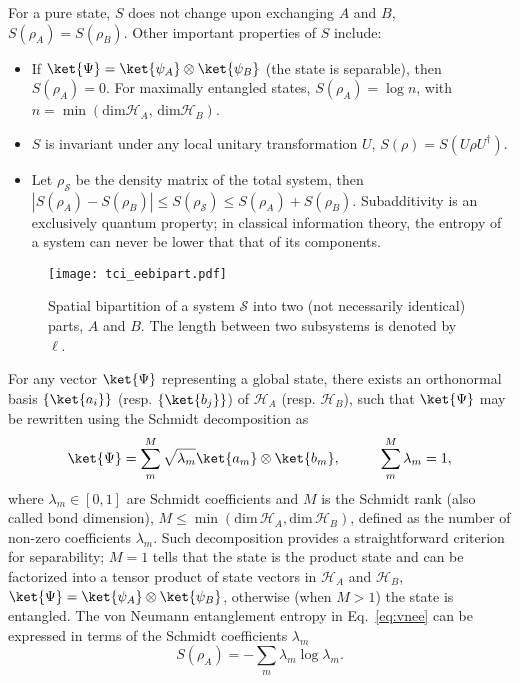 For a pure state, $S$ does not change upon exchanging $A$ and $B$, $S( \rho_A)  = S( \rho_B)$. Other important properties of $S$ include:
\begin{itemize}
\item If $\ket{\Psi} = \ket{\psi_A} \otimes \ket{\psi_B}$ (the state is separable), then $S(\rho_A) = 0$. For maximally entangled states, $S(\rho_A) = \log n$, with $n = \min (\mathrm{dim} \mathcal{H}_A, \, \mathrm{dim} \mathcal{H}_B)$. 
\item $S$ is invariant under any local unitary transformation $U$, $S( \rho) = S (U \rho U^{\dagger})$.
\item Let $\rho_{\mathcal{S}}$ be the density matrix of the total system, then $| S(\rho_A) - S(\rho_B) | \leq S( \rho_{\mathcal{S}}) \leq S(\rho_A) + S(\rho_B)$. Subadditivity is an exclusively quantum property; in classical information theory, the entropy of a system can never be lower that that of its components.
\end{itemize}

\begin{figure}[H]
\centering
\texttt{[image: tci\_eebipart.pdf]}
\caption[Spatial bipartition]{Spatial bipartition of a system $\mathcal{S}$ into two (not necessarily identical) parts, $A$ and $B$. The length between two subsystems is denoted by $\ell$.}
\label{fig:spatial_bipart}
\end{figure}

For any vector $\ket{\Psi}$ representing a global state, there exists an orthonormal basis $\lbrace \ket{a_i} \rbrace$ (resp. $\lbrace \ket{b_j} \rbrace$) of $\mathcal{H}_{A}$ (resp. $\mathcal{H}_{B}$), such that $\ket{\Psi}$ may be rewritten using the Schmidt decomposition as
\begin{equation}
\ket{\Psi} = \sum^M_{m} \sqrt{\lambda_m} \ket{a_m} \otimes \ket{b_m}, \hspace*{1cm} \sum^M_{m} \lambda_m = 1,
\label{eq:schmidt_dec}
\end{equation}
where $\lambda_m \in [0, 1]$ are Schmidt coefficients and $M$ is the Schmidt rank (also called bond dimension), $M \leq \min (\mathrm{dim} \, \mathcal{H}_{A}, \mathrm{dim} \, \mathcal{H}_{B})$, defined as the number of non-zero coefficients $\lambda_m$. Such decomposition provides a straightforward criterion for separability; $M = 1$ tells that the state is the product state and can be factorized into a tensor product of state vectors in $\mathcal{H}_{A}$ and $\mathcal{H}_{B}$, $\ket{\Psi} = \ket{\psi_A} \otimes \ket{\psi_B}$, otherwise (when $M > 1$) the state is entangled. The von Neumann entanglement entropy in Eq.~\eqref{eq:vnee} can be expressed in terms of the Schmidt coefficients $\lambda_m$
\begin{equation}
S (\rho_A) = - \sum_m \lambda_m \log \lambda_m.
\end{equation}

